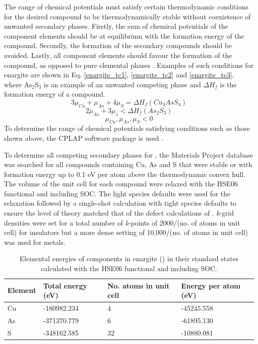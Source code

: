 \documentclass[11pt, twoside]{report}
\begin{document}
The range of chemical potentials must satisfy certain thermodynamic conditions for the desired compound to be thermodynamically stable without coexistence of unwanted secondary phases. Firstly, the sum of chemical potentials of the component elements should be at equilibrium with the formation energy of the compound. Secondly, the formation of the secondary compounds should be avoided. Lastly, all component elements should favour the formation of the compound, as opposed to pure elemental phases \cite{defects_Chen}. Examples of such conditions for enargite are shown in Eq. \ref{enargite_tc1}, \ref{enargite_tc2} and \ref{enargite_tc3}, where As$_2$S$_3$ is an example of an unwanted competing phase and $\Delta H_f$ is the formation energy of a compound.
\begin{equation}\label{enargite_tc1}
3\mu_{Cu} + \mu_{As} + 4\mu_{S} = \Delta H_f(Cu_3AsS_4)    
\end{equation}
\begin{equation}\label{enargite_tc2}
2\mu_{As} + 3\mu_{s} < \Delta H_f(As_2S_3)
\end{equation}
\begin{equation}\label{enargite_tc3}
\mu_{Cu}, \mu_{As}, \mu_{S} < 0    
\end{equation}
To determine the range of chemical potentials satisfying conditions such as those shown above, the CPLAP software package is used \cite{cplap}. 

To determine all competing secondary phases for {\enargite}, the Materials Project \cite{materials_project} database was searched for all compounds containing Cu, As and S that were stable or with formation energy up to 0.1 eV per atom above the thermodynamic convex hull. The volume of the unit cell for each compound were relaxed with the HSE06 functional and including SOC. The light species defaults were used for the relaxation followed by a single-shot calculation with tight species defaults to ensure the level of theory matched that of the defect calculations of {\enargite}. \textit{k}-grid densities were set for a total number of \textit{k}-points of 2000/(no. of atoms in unit cell) for insulators but a more dense setting of 10,000/(no. of atoms in unit cell) was used for metals.

\begin{table}[h!]
\begin{tabular}{@{}llll@{}}
\toprule
Element & Total energy (eV) & No. atoms in unit cell & Energy per atom (eV)      \\ \midrule
Cu      & -180982.234      & 4                      & -45245.558 \\
As      & -371370.779      & 6                      & -61895.130 \\
S       & -348162.585       & 32                     & -10880.081 \\ \bottomrule
\end{tabular}
\caption{Elemental energies of components in enargite ({\enargite}) in their standard states calculated with the HSE06 functional and including SOC.}\label{enargite_elements}
\end{table}
\end{document}
